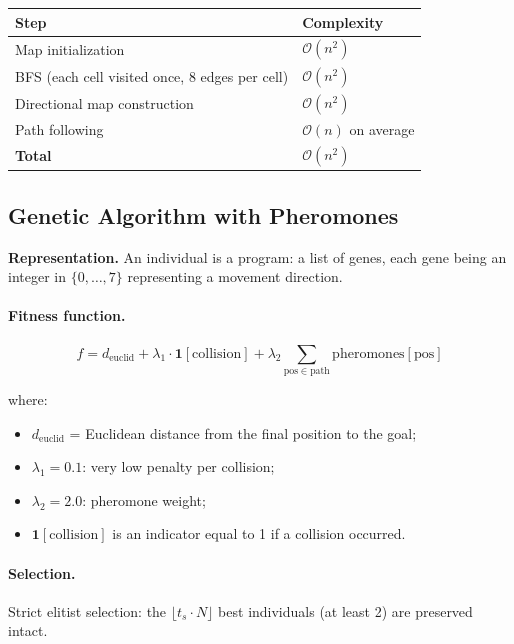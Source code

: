 \documentclass[12pt, a4paper]{article}
\theoremstyle{definition}
\newcommand{\bigO}[1]{\mathcal{O}\!\left(#1\right)}
\begin{document}
\begin{center}
\begin{tabular}{ll}
    \toprule
    Step & Complexity \\
    \midrule
    Map initialization & $\bigO{n^2}$ \\
    BFS (each cell visited once, 8 edges per cell) & $\bigO{n^2}$ \\
    Directional map construction & $\bigO{n^2}$ \\
    Path following & $\bigO{n}$ on average \\
    \midrule
    \textbf{Total} & $\bigO{n^2}$ \\
    \bottomrule
\end{tabular}
\end{center}

\subsection{Genetic Algorithm with Pheromones}

\textbf{Representation.}
An individual is a program: a list of genes, each gene being an integer in
$\{0, \ldots, 7\}$ representing a movement direction.

\paragraph{Fitness function.}
\begin{equation}
    f = d_{\mathrm{euclid}}
      + \lambda_1 \cdot \mathbf{1}[\mathrm{collision}]
      + \lambda_2 \sum_{\mathrm{pos} \in \mathrm{path}} \mathrm{pheromones}[\mathrm{pos}]
\end{equation}

where:
\begin{itemize}
    \item $d_{\mathrm{euclid}}$ = Euclidean distance from the final position to the goal;
    \item $\lambda_1 = 0.1$: very low penalty per collision;
    \item $\lambda_2 = 2.0$: pheromone weight;
    \item $\mathbf{1}[\mathrm{collision}]$ is an indicator equal to 1 if a collision occurred.
\end{itemize}

\paragraph{Selection.}
Strict elitist selection: the $\lfloor t_s \cdot N \rfloor$ best individuals
(at least 2) are preserved intact.
\end{document}
